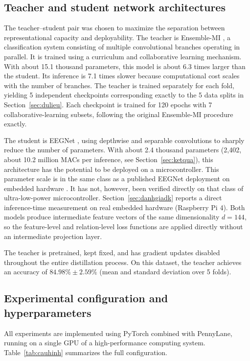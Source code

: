 \subsection{Teacher and student network architectures}
\label{sec:kientruc}

The teacher--student pair was chosen to maximize the separation
between representational capacity and deployability. The teacher is
Ensemble-MI \cite{zoumpourlis2024motor}, a classification system
consisting of multiple convolutional branches operating in parallel.
It is trained using a curriculum and collaborative learning
mechanism. With about 15.1 thousand parameters, this model is about 6.3 times
larger than the student. Its inference is 7.1 times slower because
computational cost scales with the number of branches.
The teacher is trained separately for each fold, yielding 5
independent checkpoints corresponding exactly to the 5 data splits
in Section~\ref{sec:dulieu}. Each checkpoint is trained for 120
epochs with 7 collaborative-learning subsets, following the original
Ensemble-MI procedure exactly.

The student is EEGNet \cite{lawhern2018eegnet}, using depthwise and
separable convolutions to sharply reduce the number of parameters.
With about 2.4 thousand parameters (2,402, about 10.2 million MACs
per inference, see Section~\ref{sec:ketqua}), this architecture has
the potential to be deployed on a microcontroller. This parameter
scale is in the same class as a published EEGNet deployment on
embedded hardware \cite{wang2024mibminet}. It has not, however, been verified directly on
that class of ultra-low-power microcontroller. Section~\ref{sec:danhgiadk} reports a direct
inference-time measurement on real embedded hardware (Raspberry Pi
4). Both models produce intermediate feature vectors of the same
dimensionality $d = 144$, so the feature-level and relation-level
loss functions are applied directly without an intermediate
projection layer.

The teacher is pretrained, kept fixed, and has gradient updates
disabled throughout the entire distillation process. On this
dataset, the teacher achieves an accuracy of $84.98\% \pm 2.59\%$
(mean and standard deviation over 5 folds).

\subsection{Experimental configuration and hyperparameters}
\label{sec:cauhinh}

All experiments are implemented using PyTorch combined with
PennyLane, running on a single GPU of a high-performance computing
system. Table~\ref{tab:cauhinh} summarizes the full configuration.

